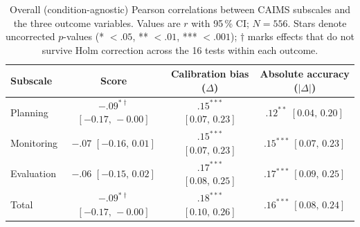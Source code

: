 \documentclass[manuscript,review,anonymous]{acmart}
\begin{document}
\begin{table}[!htp]
\centering
\caption{Overall (condition-agnostic) Pearson correlations between
CAIMS subscales and the three outcome variables. Values are
$r$ with 95\,\% CI; $N = 556$. Stars denote uncorrected $p$-values
(* $<.05$, ** $<.01$, *** $<.001$); $\dagger$ marks effects that
do not survive Holm correction across the 16 tests within each
outcome.}
\label{tab:caims-overall}
\begin{tabular}{lccc}
\hline Subscale     & Score                                & Calibration bias ($\Delta$)             & Absolute accuracy ($|\Delta|$)        \\ \hline
Planning             & $-.09^{*\dagger}$ $[-0.17,\,-0.00]$  & $.15^{***}$ $[0.07,\,0.23]$            & $.12^{**}$ $[0.04,\,0.20]$            \\
Monitoring           & $-.07$ $[-0.16,\,0.01]$              & $.15^{***}$ $[0.07,\,0.23]$            & $.15^{***}$  $[0.07,\,0.23]$           \\
Evaluation           & $-.06$  $[-0.15,\,0.02]$              &  $.17^{***}$ $[0.08,\,0.25]$            &  $.17^{***}$ $[0.09,\,0.25]$           \\
Total                & $-.09^{*\dagger}$ $[-0.17,\,-0.00]$  & $.18^{***}$  $[0.10,\,0.26]$            & $.16^{***}$ $[0.08,\,0.24]$           \\
\hline
\end{tabular}
\end{table}

\begin{table}[!htp]
\centering
\caption{CAIMS subscale and total descriptives by condition. Values
are means with standard deviations in parentheses on the 1--5 metric;
$F$, $p$, and $\eta^2$ are from one-way ANOVAs comparing the three
conditions.}
\label{tab:caims-means}
\end{table}
\end{document}
